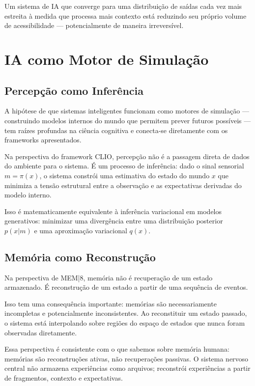 \documentclass[11pt, a4paper]{article}
\theoremstyle{named}
\begin{document}
Um sistema de IA que converge para uma distribuição de saídas cada
vez mais estreita à medida que processa mais contexto está reduzindo
seu próprio volume de acessibilidade — potencialmente de maneira
irreversível.

\section{IA como Motor de Simulação}

\subsection{Percepção como Inferência}

A hipótese de que sistemas inteligentes funcionam como motores de
simulação — construindo modelos internos do mundo que permitem prever
futuros possíveis — tem raízes profundas na ciência cognitiva e
conecta-se diretamente com os frameworks apresentados.

Na perspectiva do framework CLIO, percepção não é a passagem direta
de dados do ambiente para o sistema. É um processo de inferência:
dado o sinal sensorial $m = \pi(x)$, o sistema constrói uma
estimativa do estado do mundo $x$ que minimiza a tensão estrutural
entre a observação e as expectativas derivadas do modelo interno.

Isso é matematicamente equivalente à inferência variacional em
modelos generativos: minimizar uma divergência entre uma distribuição
posterior $p(x|m)$ e uma aproximação variacional $q(x)$.

\subsection{Memória como Reconstrução}

Na perspectiva de MEM|8, memória não é recuperação de um estado
armazenado. É reconstrução de um estado a partir de uma sequência
de eventos.

Isso tem uma consequência importante: memórias são necessariamente
incompletas e potencialmente inconsistentes. Ao reconstituir um estado
passado, o sistema está interpolando sobre regiões do espaço de estados
que nunca foram observadas diretamente.

Essa perspectiva é consistente com o que sabemos sobre memória humana:
memórias são reconstruções ativas, não recuperações passivas.
O sistema nervoso central não armazena experiências como arquivos;
reconstrói experiências a partir de fragmentos, contexto e expectativas.
\end{document}
